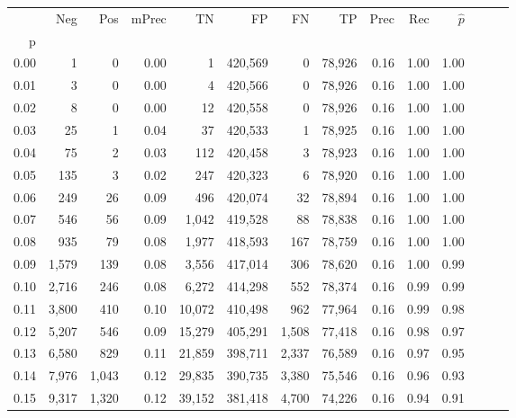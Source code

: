 \begin{tabular}{rrrrrrrrrrrrrr}
\toprule
{} &     Neg &    Pos & mPrec &       TN &       FP &      FN &      TP &  Prec &   Rec & $\hat{p}$ \\
p    &         &        &       &          &          &         &         &       &       &           \\
\midrule
0.00 &       1 &      0 &  0.00 &        1 &  420,569 &       0 &  78,926 &  0.16 &  1.00 &      1.00 \\
0.01 &       3 &      0 &  0.00 &        4 &  420,566 &       0 &  78,926 &  0.16 &  1.00 &      1.00 \\
0.02 &       8 &      0 &  0.00 &       12 &  420,558 &       0 &  78,926 &  0.16 &  1.00 &      1.00 \\
0.03 &      25 &      1 &  0.04 &       37 &  420,533 &       1 &  78,925 &  0.16 &  1.00 &      1.00 \\
0.04 &      75 &      2 &  0.03 &      112 &  420,458 &       3 &  78,923 &  0.16 &  1.00 &      1.00 \\
0.05 &     135 &      3 &  0.02 &      247 &  420,323 &       6 &  78,920 &  0.16 &  1.00 &      1.00 \\
0.06 &     249 &     26 &  0.09 &      496 &  420,074 &      32 &  78,894 &  0.16 &  1.00 &      1.00 \\
0.07 &     546 &     56 &  0.09 &    1,042 &  419,528 &      88 &  78,838 &  0.16 &  1.00 &      1.00 \\
0.08 &     935 &     79 &  0.08 &    1,977 &  418,593 &     167 &  78,759 &  0.16 &  1.00 &      1.00 \\
0.09 &   1,579 &    139 &  0.08 &    3,556 &  417,014 &     306 &  78,620 &  0.16 &  1.00 &      0.99 \\
0.10 &   2,716 &    246 &  0.08 &    6,272 &  414,298 &     552 &  78,374 &  0.16 &  0.99 &      0.99 \\
0.11 &   3,800 &    410 &  0.10 &   10,072 &  410,498 &     962 &  77,964 &  0.16 &  0.99 &      0.98 \\
0.12 &   5,207 &    546 &  0.09 &   15,279 &  405,291 &   1,508 &  77,418 &  0.16 &  0.98 &      0.97 \\
0.13 &   6,580 &    829 &  0.11 &   21,859 &  398,711 &   2,337 &  76,589 &  0.16 &  0.97 &      0.95 \\
0.14 &   7,976 &  1,043 &  0.12 &   29,835 &  390,735 &   3,380 &  75,546 &  0.16 &  0.96 &      0.93 \\
0.15 &   9,317 &  1,320 &  0.12 &   39,152 &  381,418 &   4,700 &  74,226 &  0.16 &  0.94 &      0.91 \\

\end{tabular}
